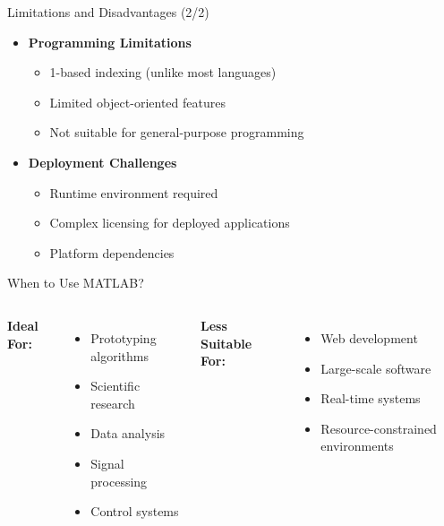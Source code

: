 \documentclass[10pt]{beamer}
\theoremstyle{plain}%
\theoremstyle{definition}
\theoremstyle{remark}
\begin{document}
\begin{frame}{Limitations and Disadvantages (2/2)}
\begin{itemize}
    \item \textbf{Programming Limitations}
        \begin{itemize}
            \item 1-based indexing (unlike most languages)
            \item Limited object-oriented features
            \item Not suitable for general-purpose programming
        \end{itemize}
    \item \textbf{Deployment Challenges}
        \begin{itemize}
            \item Runtime environment required
            \item Complex licensing for deployed applications
            \item Platform dependencies
        \end{itemize}
\end{itemize}
\end{frame}

\begin{frame}{When to Use MATLAB?}
\begin{columns}
\textbf{Ideal For:}
\begin{itemize}
    \item Prototyping algorithms
    \item Scientific research
    \item Data analysis
    \item Signal processing
    \item Control systems
\end{itemize}

\textbf{Less Suitable For:}
\begin{itemize}
    \item Web development
    \item Large-scale software
    \item Real-time systems
    \item Resource-constrained environments
\end{itemize}
\end{columns}
\end{frame}
\end{document}

